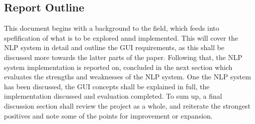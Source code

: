\subsection{Report Outline}

This document begins with a background to the field, which feeds into spefification of what is to be explored annd implemented. This will cover the NLP system in detail and outline the GUI requirements, as this shall be discussed more towards the latter parts of the paper. Following that, the NLP system implementation is reported on, concluded in the next section which evaluates the strengths and weaknesses of the NLP system. One the NLP system has been discussed, the GUI concepts shall be explained in full, the implementation discussed and evaluation completed. To sum up, a final discussion section shall review the project as a whole, and reiterate the strongest positives and note some of the points for improvement or expansion.


